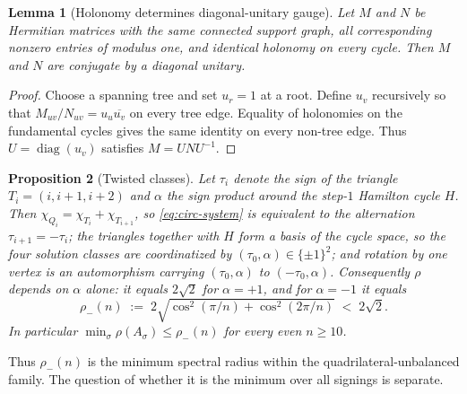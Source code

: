 \documentclass[11pt]{article}
\newtheorem{lemma}{Lemma}
\newtheorem{proposition}[lemma]{Proposition}
\theoremstyle{remark}
\newcommand{\rhomax}{\rho}
\begin{document}
\begin{lemma}[Holonomy determines diagonal-unitary gauge]\label{lem:holonomy-gauge}
Let $M$ and $N$ be Hermitian matrices with the same connected support graph,
all corresponding nonzero entries of modulus one, and identical holonomy on
every cycle. Then $M$ and $N$ are conjugate by a diagonal unitary.
\end{lemma}

\begin{proof}
Choose a spanning tree and set $u_r=1$ at a root. Define $u_v$ recursively so
that $M_{uv}/N_{uv}=u_u\overline{u_v}$ on every tree edge. Equality of
holonomies on the fundamental cycles gives the same identity on every
non-tree edge. Thus $U=\operatorname{diag}(u_v)$ satisfies $M=UNU^{-1}$.
\end{proof}

\begin{proposition}[Twisted classes]\label{prop:twist}
Let $\tau_i$ denote the
sign of the triangle $T_i=(i,i{+}1,i{+}2)$ and $\alpha$ the sign product
around the step-$1$ Hamilton cycle $H$. Then
$\chi_{Q_i}=\chi_{T_i}+\chi_{T_{i+1}}$, so \eqref{eq:circ-system} is equivalent
to the alternation $\tau_{i+1}=-\tau_i$; the triangles together with $H$
form a basis of the cycle space, so the four solution classes are
coordinatized by $(\tau_0,\alpha)\in\{\pm1\}^2$; and rotation by one
vertex is an automorphism carrying $(\tau_0,\alpha)$ to
$(-\tau_0,\alpha)$. Consequently $\rhomax$ depends on $\alpha$ alone: it
equals $2\sqrt2$ for $\alpha=+1$, and for $\alpha=-1$ it equals
\[
\rho_-(n)\;:=\;2\sqrt{\cos^2(\pi/n)+\cos^2(2\pi/n)}\;<\;2\sqrt2 .
\]
In particular $\min_\sigma\rhomax(A_\sigma)\le\rho_-(n)$ for every even
$n\ge10$.
\end{proposition}

Thus $\rho_-(n)$ is the minimum spectral radius within the
quadrilateral-unbalanced family. The question of whether it is the
minimum over all signings is separate.
\end{document}
